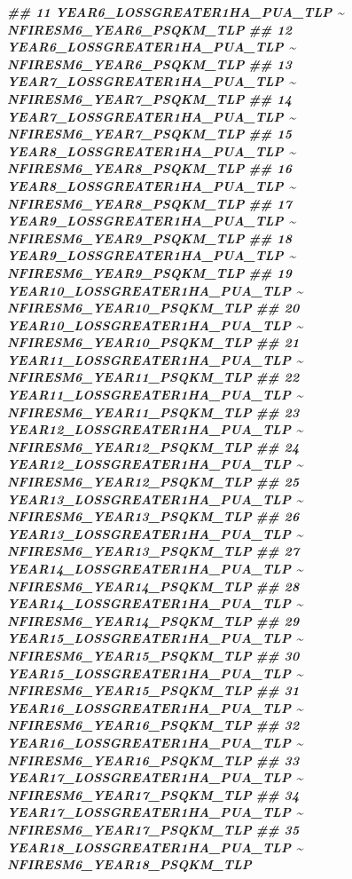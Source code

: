 \documentclass[10pt,landscape,a3paper]{article}
\newenvironment{Shaded}{\begin{snugshade}}{\end{snugshade}}
\newcommand{\DocumentationTok}[1]{\textcolor[rgb]{0.56,0.35,0.01}{\textbf{\textit{#1}}}}
\begin{document}
\begin{Shaded}
\begin{Highlighting}[]
\DocumentationTok{\#\# 11   YEAR6\_LOSSGREATER1HA\_PUA\_TLP \textasciitilde{} NFIRESM6\_YEAR6\_PSQKM\_TLP}
\DocumentationTok{\#\# 12   YEAR6\_LOSSGREATER1HA\_PUA\_TLP \textasciitilde{} NFIRESM6\_YEAR6\_PSQKM\_TLP}
\DocumentationTok{\#\# 13   YEAR7\_LOSSGREATER1HA\_PUA\_TLP \textasciitilde{} NFIRESM6\_YEAR7\_PSQKM\_TLP}
\DocumentationTok{\#\# 14   YEAR7\_LOSSGREATER1HA\_PUA\_TLP \textasciitilde{} NFIRESM6\_YEAR7\_PSQKM\_TLP}
\DocumentationTok{\#\# 15   YEAR8\_LOSSGREATER1HA\_PUA\_TLP \textasciitilde{} NFIRESM6\_YEAR8\_PSQKM\_TLP}
\DocumentationTok{\#\# 16   YEAR8\_LOSSGREATER1HA\_PUA\_TLP \textasciitilde{} NFIRESM6\_YEAR8\_PSQKM\_TLP}
\DocumentationTok{\#\# 17   YEAR9\_LOSSGREATER1HA\_PUA\_TLP \textasciitilde{} NFIRESM6\_YEAR9\_PSQKM\_TLP}
\DocumentationTok{\#\# 18   YEAR9\_LOSSGREATER1HA\_PUA\_TLP \textasciitilde{} NFIRESM6\_YEAR9\_PSQKM\_TLP}
\DocumentationTok{\#\# 19 YEAR10\_LOSSGREATER1HA\_PUA\_TLP \textasciitilde{} NFIRESM6\_YEAR10\_PSQKM\_TLP}
\DocumentationTok{\#\# 20 YEAR10\_LOSSGREATER1HA\_PUA\_TLP \textasciitilde{} NFIRESM6\_YEAR10\_PSQKM\_TLP}
\DocumentationTok{\#\# 21 YEAR11\_LOSSGREATER1HA\_PUA\_TLP \textasciitilde{} NFIRESM6\_YEAR11\_PSQKM\_TLP}
\DocumentationTok{\#\# 22 YEAR11\_LOSSGREATER1HA\_PUA\_TLP \textasciitilde{} NFIRESM6\_YEAR11\_PSQKM\_TLP}
\DocumentationTok{\#\# 23 YEAR12\_LOSSGREATER1HA\_PUA\_TLP \textasciitilde{} NFIRESM6\_YEAR12\_PSQKM\_TLP}
\DocumentationTok{\#\# 24 YEAR12\_LOSSGREATER1HA\_PUA\_TLP \textasciitilde{} NFIRESM6\_YEAR12\_PSQKM\_TLP}
\DocumentationTok{\#\# 25 YEAR13\_LOSSGREATER1HA\_PUA\_TLP \textasciitilde{} NFIRESM6\_YEAR13\_PSQKM\_TLP}
\DocumentationTok{\#\# 26 YEAR13\_LOSSGREATER1HA\_PUA\_TLP \textasciitilde{} NFIRESM6\_YEAR13\_PSQKM\_TLP}
\DocumentationTok{\#\# 27 YEAR14\_LOSSGREATER1HA\_PUA\_TLP \textasciitilde{} NFIRESM6\_YEAR14\_PSQKM\_TLP}
\DocumentationTok{\#\# 28 YEAR14\_LOSSGREATER1HA\_PUA\_TLP \textasciitilde{} NFIRESM6\_YEAR14\_PSQKM\_TLP}
\DocumentationTok{\#\# 29 YEAR15\_LOSSGREATER1HA\_PUA\_TLP \textasciitilde{} NFIRESM6\_YEAR15\_PSQKM\_TLP}
\DocumentationTok{\#\# 30 YEAR15\_LOSSGREATER1HA\_PUA\_TLP \textasciitilde{} NFIRESM6\_YEAR15\_PSQKM\_TLP}
\DocumentationTok{\#\# 31 YEAR16\_LOSSGREATER1HA\_PUA\_TLP \textasciitilde{} NFIRESM6\_YEAR16\_PSQKM\_TLP}
\DocumentationTok{\#\# 32 YEAR16\_LOSSGREATER1HA\_PUA\_TLP \textasciitilde{} NFIRESM6\_YEAR16\_PSQKM\_TLP}
\DocumentationTok{\#\# 33 YEAR17\_LOSSGREATER1HA\_PUA\_TLP \textasciitilde{} NFIRESM6\_YEAR17\_PSQKM\_TLP}
\DocumentationTok{\#\# 34 YEAR17\_LOSSGREATER1HA\_PUA\_TLP \textasciitilde{} NFIRESM6\_YEAR17\_PSQKM\_TLP}
\DocumentationTok{\#\# 35 YEAR18\_LOSSGREATER1HA\_PUA\_TLP \textasciitilde{} NFIRESM6\_YEAR18\_PSQKM\_TLP}

\end{Highlighting}
\end{Shaded}
\end{document}
